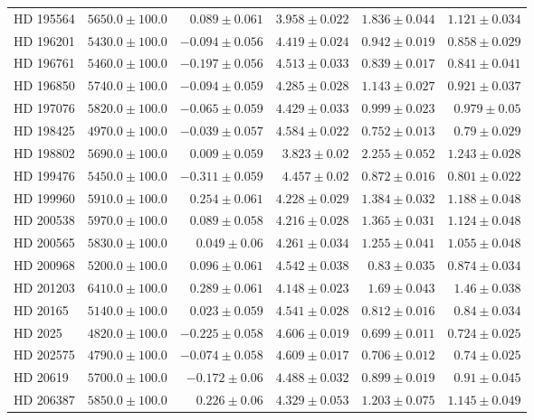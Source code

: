 \begin{longtable*}{lrrrrr}
HD 195564 & $5650.0\pm 100.0$ & $0.089\pm 0.061$ & $3.958\pm 0.022$ & $1.836\pm 0.044$ & $1.121\pm 0.034$ \\ 
HD 196201 & $5430.0\pm 100.0$ & $-0.094\pm 0.056$ & $4.419\pm 0.024$ & $0.942\pm 0.019$ & $0.858\pm 0.029$ \\ 
HD 196761 & $5460.0\pm 100.0$ & $-0.197\pm 0.056$ & $4.513\pm 0.033$ & $0.839\pm 0.017$ & $0.841\pm 0.041$ \\ 
HD 196850 & $5740.0\pm 100.0$ & $-0.094\pm 0.059$ & $4.285\pm 0.028$ & $1.143\pm 0.027$ & $0.921\pm 0.037$ \\ 
HD 197076 & $5820.0\pm 100.0$ & $-0.065\pm 0.059$ & $4.429\pm 0.033$ & $0.999\pm 0.023$ & $0.979\pm 0.05$ \\ 
HD 198425 & $4970.0\pm 100.0$ & $-0.039\pm 0.057$ & $4.584\pm 0.022$ & $0.752\pm 0.013$ & $0.79\pm 0.029$ \\ 
HD 198802 & $5690.0\pm 100.0$ & $0.009\pm 0.059$ & $3.823\pm 0.02$ & $2.255\pm 0.052$ & $1.243\pm 0.028$ \\ 
HD 199476 & $5450.0\pm 100.0$ & $-0.311\pm 0.059$ & $4.457\pm 0.02$ & $0.872\pm 0.016$ & $0.801\pm 0.022$ \\ 
HD 199960 & $5910.0\pm 100.0$ & $0.254\pm 0.061$ & $4.228\pm 0.029$ & $1.384\pm 0.032$ & $1.188\pm 0.048$ \\ 
HD 200538 & $5970.0\pm 100.0$ & $0.089\pm 0.058$ & $4.216\pm 0.028$ & $1.365\pm 0.031$ & $1.124\pm 0.048$ \\ 
HD 200565 & $5830.0\pm 100.0$ & $0.049\pm 0.06$ & $4.261\pm 0.034$ & $1.255\pm 0.041$ & $1.055\pm 0.048$ \\ 
HD 200968 & $5200.0\pm 100.0$ & $0.096\pm 0.061$ & $4.542\pm 0.038$ & $0.83\pm 0.035$ & $0.874\pm 0.034$ \\ 
HD 201203 & $6410.0\pm 100.0$ & $0.289\pm 0.061$ & $4.148\pm 0.023$ & $1.69\pm 0.043$ & $1.46\pm 0.038$ \\ 
HD 20165 & $5140.0\pm 100.0$ & $0.023\pm 0.059$ & $4.541\pm 0.028$ & $0.812\pm 0.016$ & $0.84\pm 0.034$ \\ 
HD 2025 & $4820.0\pm 100.0$ & $-0.225\pm 0.058$ & $4.606\pm 0.019$ & $0.699\pm 0.011$ & $0.724\pm 0.025$ \\ 
HD 202575 & $4790.0\pm 100.0$ & $-0.074\pm 0.058$ & $4.609\pm 0.017$ & $0.706\pm 0.012$ & $0.74\pm 0.025$ \\ 
HD 20619 & $5700.0\pm 100.0$ & $-0.172\pm 0.06$ & $4.488\pm 0.032$ & $0.899\pm 0.019$ & $0.91\pm 0.045$ \\ 
HD 206387 & $5850.0\pm 100.0$ & $0.226\pm 0.06$ & $4.329\pm 0.053$ & $1.203\pm 0.075$ & $1.145\pm 0.049$ \\ 

\end{longtable*}
